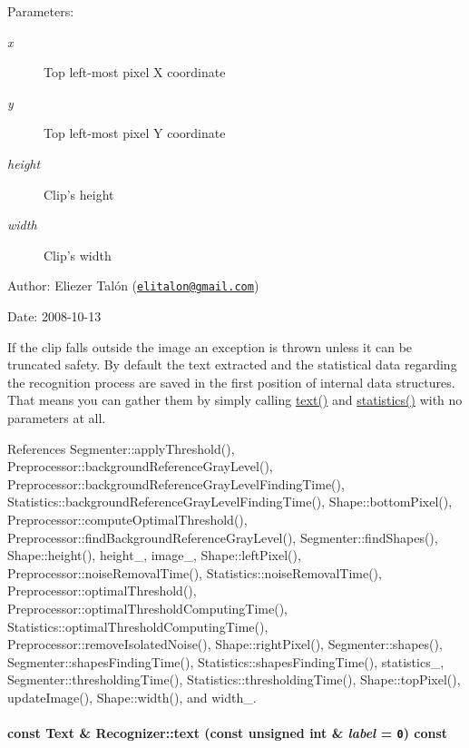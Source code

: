 \begin{Desc}
\item[Parameters:]
\begin{description}
\item[{\em x}]Top left-most pixel X coordinate \item[{\em y}]Top left-most pixel Y coordinate \item[{\em height}]Clip's height \item[{\em width}]Clip's width\end{description}
\end{Desc}
\begin{Desc}
\item[Author:]Eliezer Talón (\href{mailto:elitalon@gmail.com}{\tt elitalon@gmail.com}) \end{Desc}
\begin{Desc}
\item[Date:]2008-10-13\end{Desc}
If the clip falls outside the image an exception is thrown unless it can be truncated safety. By default the text extracted and the statistical data regarding the recognition process are saved in the first position of internal data structures. That means you can gather them by simply calling \hyperlink{class_recognizer_c5d20b511888a60a6c1a81c0a4206ec2}{text()} and \hyperlink{class_recognizer_8b38356d2741969e67cd6b4f507897ba}{statistics()} with no parameters at all. 

References Segmenter::applyThreshold(), Preprocessor::backgroundReferenceGrayLevel(), Preprocessor::backgroundReferenceGrayLevelFindingTime(), Statistics::backgroundReferenceGrayLevelFindingTime(), Shape::bottomPixel(), Preprocessor::computeOptimalThreshold(), Preprocessor::findBackgroundReferenceGrayLevel(), Segmenter::findShapes(), Shape::height(), height\_\-, image\_\-, Shape::leftPixel(), Preprocessor::noiseRemovalTime(), Statistics::noiseRemovalTime(), Preprocessor::optimalThreshold(), Preprocessor::optimalThresholdComputingTime(), Statistics::optimalThresholdComputingTime(), Preprocessor::removeIsolatedNoise(), Shape::rightPixel(), Segmenter::shapes(), Segmenter::shapesFindingTime(), Statistics::shapesFindingTime(), statistics\_\-, Segmenter::thresholdingTime(), Statistics::thresholdingTime(), Shape::topPixel(), updateImage(), Shape::width(), and width\_\-.\hypertarget{class_recognizer_c5d20b511888a60a6c1a81c0a4206ec2}{
\paragraph[text]{\setlength{\rightskip}{0pt plus 5cm}const {\bf Text} \& Recognizer::text (const unsigned int \& {\em label} = {\tt 0}) const}\hfill}
\label{class_recognizer_c5d20b511888a60a6c1a81c0a4206ec2}


